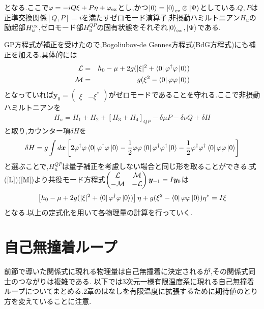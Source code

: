 \documentclass[10.5pt,a4paper]{jreport}
\begin{document}
となる.ここで$\varphi = -iQ\xi + P\eta + \varphi_{\rm ex}$とし,かつ$\ket{0} = \ket{0}_{\rm ex}\otimes\ket{\Psi}$としている.$Q,P$は正準交換関係$[Q,P] = i$を満たすゼロモード演算子,非摂動ハミルトニアン$H_u$の励起部$H_u^{\rm ex}$,ゼロモード部$H_u^{QP}$の固有状態をそれぞれ$\ket{0}_{\rm ex},\ket{\Psi}$である.

GP方程式が補正を受けたので,Bogoliubov-de Gennes方程式(BdG方程式)にも補正を加える.具体的には
\begin{eqnarray}
  {\cal L} &=&  h_0 - \mu + 2g(|\xi|^2 + \bra{0}\varphi^\dagger\varphi\ket{0})\label{L}\\
  {\cal M} &=& g(\xi^2 - \bra{0}\varphi\varphi\ket{0})\label{M}
\end{eqnarray}
となっていれば$\bm{y}_0 = \begin{pmatrix}\xi & -\xi^*  \end{pmatrix}$がゼロモードであることを守れる.ここで非摂動ハミルトニアンを
\begin{eqnarray}
  H_u = H_1 + H_2 + [H_3 + H_4]_{QP} -\delta\mu P -\delta\nu Q + \delta H
\end{eqnarray}
と取り,カウンター項$\delta H$を
\begin{eqnarray}
  \delta H = g\int d\bm{x}\left[2\varphi^\dagger\varphi\bra{0}\varphi^\dagger\varphi\ket{0}-\frac{1}{2}\varphi\varphi\bra{0}\varphi^\dagger\varphi^\dagger\ket{0}-\frac{1}{2}\varphi^\dagger\varphi^\dagger\bra{0}\varphi\varphi\ket{0}\right]
\end{eqnarray}
と選ぶことで,$H_u^{QP}$は量子補正を考慮しない場合と同じ形を取ることができる.式(\ref{L})(\ref{M})より共役モード方程式$
\begin{pmatrix}
  {\cal L} & {\cal M}\\
  -{\cal M}&-{\cal L}
\end{pmatrix}
\bm{y}_{-1}=I\bm{y}_0
$は
\begin{eqnarray}
  \left[h_0 - \mu + 2g(|\xi|^2 + \bra{0}\varphi^\dagger\varphi\ket{0})\right]\eta + g(\xi^2 - \bra{0}\varphi\varphi\ket{0})\eta^*=I\xi
\end{eqnarray}
となる.以上の定式化を用いて各物理量の計算を行っていく.
\section{自己無撞着ループ}
前節で導いた関係式に現れる物理量は自己無撞着に決定されるが,その関係式同士のつながりは複雑である.
以下では3次元一様有限温度系に現れる自己無撞着ループについてまとめる.2章のはなしを有限温度に拡張するために期待値のとり方を変えていることに注意.
\\
\end{document}
